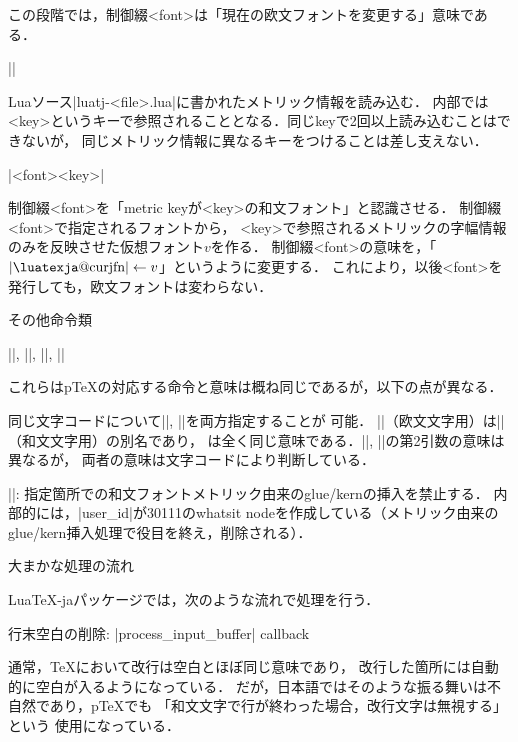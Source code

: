 この段階では，制御綴<font>は「現在の欧文フォントを変更する」意味である．

\enum ||

Luaソース|luatj-<file>.lua|に書かれたメトリック情報を読み込む．
内部では<key>というキーで参照されることとなる．同じkeyで2回以上読み込むことはできないが，
同じメトリック情報に異なるキーをつけることは差し支えない．

\enum |\jfont<font>{<key>}|

制御綴<font>を「metric keyが<key>の和文フォント」と認識させる．
\itemitem 制御綴<font>で指定されるフォントから，
<key>で参照されるメトリックの字幅情報のみを反映させた仮想フォント$v$を作る．
\itemitem 制御綴<font>の意味を，「$\hbox{|\luatexja@curjfn|}\leftarrow v$」というように変更する．
これにより，以後<font>を発行しても，欧文フォントは変わらない．

\enditem

\beginparagraph その他命令類

\item ||, ||,\hfil\break
||,  ||

これらはp\TeX の対応する命令と意味は概ね同じであるが，以下の点が異なる．

\itemitem 同じ文字コードについて|\prebreakpenalty|, |\postbreakpenalty|を両方指定することが
可能．
\itemitem |\xspcode|（欧文文字用）は|\inhibitxspcode|（和文文字用）の別名であり，
\begintt
{}  
\endtt
は全く同じ意味である．|\xspcode|, |\inhibitxspcode|の第2引数の意味は異なるが，
両者の意味は文字コードにより判断している．

\item |\inhibitglue|: 指定箇所での和文フォントメトリック由来のglue/kernの挿入を禁止する．
内部的には，|user_id|が30111のwhatsit nodeを作成している{\small（メトリック由来の
glue/kern挿入処理で役目を終え，削除される）\inhibitglue}．
\enditem


\beginparagraph 大まかな処理の流れ

Lua\TeX-jaパッケージでは，次のような流れで処理を行う．

\item 行末空白の削除: |process_input_buffer| callback

通常，\TeX において改行は空白とほぼ同じ意味であり，
改行した箇所には自動的に空白が入るようになっている．
だが，日本語ではそのような振る舞いは不自然であり，p\TeX でも
「和文文字で行が終わった場合，改行文字は無視する」という
使用になっている．

